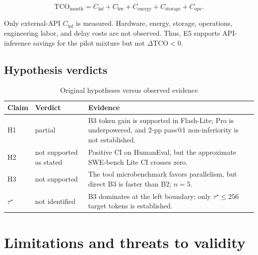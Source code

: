 \begin{equation}
\mathrm{TCO}_{\text{month}}=C_{\text{inf}}+C_{\text{hw}}+C_{\text{energy}}+C_{\text{storage}}+C_{\text{ops}}.
\label{eq:tco}
\end{equation}

Only external-API $C_{\text{inf}}$ is measured. Hardware, energy, storage, operations, engineering labor, and delay costs are not observed. Thus, E5 supports API-inference savings for the pilot mixture but not $\Delta\mathrm{TCO}<0$.

\subsection{Hypothesis verdicts}

\begin{table}[htbp]
\caption{Original hypotheses versus observed evidence}
\label{tab:hypothesis-verdict}
\centering
\begin{tabularx}{\textwidth}{@{}l l X@{}}
\toprule
Claim & Verdict & Evidence \\
\midrule
H1 & partial & B3 token gain is supported in Flash-Lite; Pro is underpowered, and 2-pp pass@1 non-inferiority is not established. \\
H2 & not supported as stated & Positive CI on HumanEval, but the approximate SWE-bench Lite CI crosses zero. \\
H3 & not supported & The tool microbenchmark favors parallelism, but direct B3 is faster than B2; $n=5$. \\
$\tau^\star$ & not identified & B3 dominates at the left boundary; only $\tau^\star\le256$ target tokens is established. \\
\bottomrule
\end{tabularx}
\end{table}

\section{Limitations and threats to validity}\label{sec:limits}

